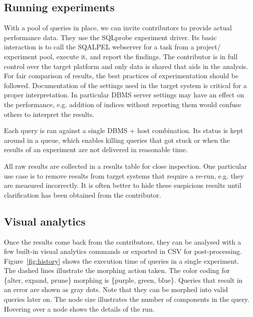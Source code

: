 \documentclass{cidr-2019}
\begin{document}
\subsection{Running experiments}
With a pool of queries in place, we can invite contributors to provide actual performance data.
They use the {\sc SQLprobe} experiment driver. 
Its basic interaction is to call the {\sc SQALPEL}
webserver for a task from a project/ experiment pool, execute it, and report the findings. 
The contributor is in full control over the target platform and only data is shared that aids in the analysis. 
For fair comparison of results, the best practices of experimentation should be followed. 
Documentation of the settings used in the target system is critical for a proper interpretation.
In particular DBMS server settings may have an effect on the performance, e.g.
addition of indices without reporting them would confuse others to interpret the results.

Each query is ran against a single DBMS + host combination. Its status is kept around in a queue, which enables killing queries that got stuck or when the results of an experiment are not delivered in reasonable time.

All raw results are collected in a results table for close inspection. One particular use
case is to remove results from target systems that require a re-run, e.g. they
are measured incorrectly. 
It is often better to hide these
suspicious results until clarification has been obtained from the contributor.

\subsection{Visual analytics}

Once the results come back from the contributors, they can be analysed with a few
built-in visual analytics commands or exported in CSV for post-processing.
Figure~\ref{fig:history} shows the
execution time of queries in a single experiment. The dashed lines illustrate the morphing action taken. 
The color coding for \{alter,
expand, prune\} morphing is \{purple, green, blue\}. Queries that result in an
error are shown as gray dots. Note that they
can be morphed into valid queries later on. The node size illustrates the number
of components in the query. Hovering over a node shows the details of the
run. 
\end{document}
